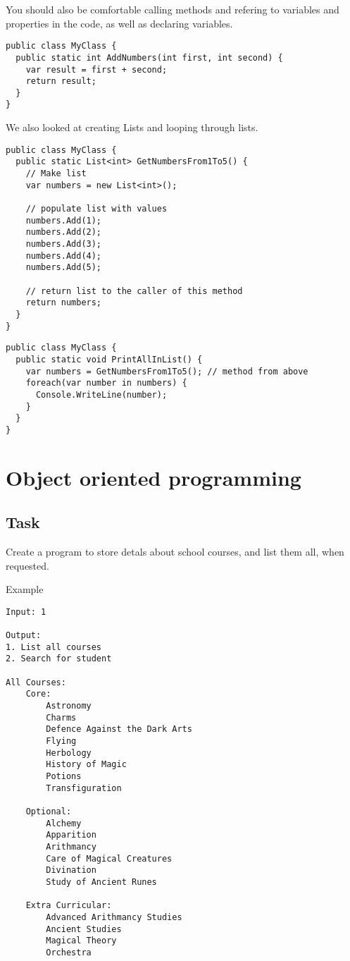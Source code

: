 \documentclass{article}
\begin{document}
You should also be comfortable calling methods and refering to variables and properties in the code, as well as declaring variables.

\begin{lstlisting}[language={[Sharp]C}, title={Declaring variables}, label={Script}]
public class MyClass {
  public static int AddNumbers(int first, int second) {
    var result = first + second;
    return result;
  }
}
\end{lstlisting}

We also looked at creating Lists and looping through lists.

\begin{lstlisting}[language={[Sharp]C}, title={Creating a list and adding items to it}, label={Script}]
public class MyClass {
  public static List<int> GetNumbersFrom1To5() {
    // Make list
    var numbers = new List<int>();

    // populate list with values
    numbers.Add(1);
    numbers.Add(2);
    numbers.Add(3);
    numbers.Add(4);
    numbers.Add(5);
    
    // return list to the caller of this method
    return numbers;	
  }
}
\end{lstlisting}

\begin{lstlisting}[language={[Sharp]C}, title={Looping over a list}, label={Script}]
public class MyClass {
  public static void PrintAllInList() {
    var numbers = GetNumbersFrom1To5(); // method from above
    foreach(var number in numbers) {
      Console.WriteLine(number);
    }
  }
}
\end{lstlisting}


\section{Object oriented programming}

\subsection{Task}
Create a program to store detals about school courses, and list them all, when requested.

\begin{titleBox}[colback=white]{Example}
\begin{verbatim}
Input: 1

Output: 
1. List all courses
2. Search for student

All Courses:
    Core:
        Astronomy
        Charms
        Defence Against the Dark Arts
        Flying
        Herbology
        History of Magic
        Potions
        Transfiguration

    Optional:
        Alchemy
        Apparition
        Arithmancy
        Care of Magical Creatures
        Divination
        Study of Ancient Runes

    Extra Curricular:
        Advanced Arithmancy Studies
        Ancient Studies
        Magical Theory
        Orchestra
\end{verbatim}
\end{titleBox}
\end{document}

